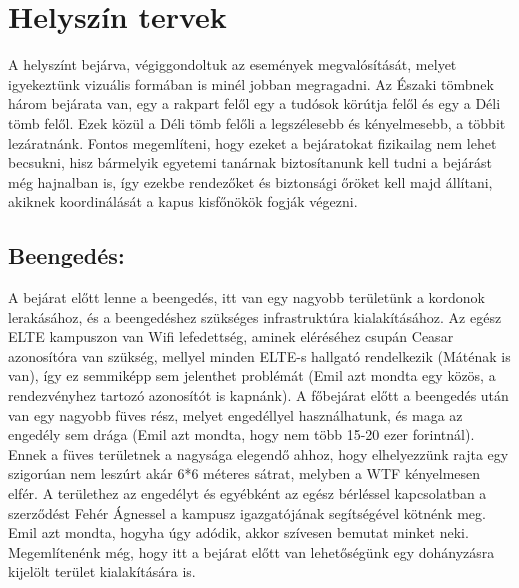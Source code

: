 \section{Helyszín tervek}
\hspace{2mm} A helyszínt bejárva, végiggondoltuk az események megvalósítását, melyet igyekeztünk vizuális formában is minél jobban megragadni. Az Északi tömbnek három bejárata van, egy a rakpart felől egy a tudósok körútja felől és egy a Déli tömb felől. Ezek közül a Déli tömb felőli a legszélesebb és kényelmesebb, a többit lezáratnánk. Fontos megemlíteni, hogy ezeket a bejáratokat fizikailag nem lehet becsukni, hisz bármelyik egyetemi tanárnak biztosítanunk kell tudni a bejárást még hajnalban is, így ezekbe rendezőket és biztonsági őröket kell majd állítani, akiknek koordinálását a kapus kisfőnökök fogják végezni. 

\subsection{Beengedés:}
\hspace{2mm} A bejárat előtt lenne a beengedés, itt van egy nagyobb területünk a kordonok lerakásához, és a beengedéshez szükséges infrastruktúra kialakításához. Az egész ELTE kampuszon van Wifi lefedettség, aminek eléréséhez csupán Ceasar azonosítóra van szükség, mellyel minden ELTE-s hallgató rendelkezik (Máténak is van), így ez semmiképp sem jelenthet problémát (Emil azt mondta egy közös, a rendezvényhez tartozó azonosítót is kapnánk).
\indent A főbejárat előtt a beengedés után van egy nagyobb füves rész, melyet engedéllyel használhatunk, és maga az engedély sem drága (Emil azt mondta, hogy nem több 15-20 ezer forintnál). Ennek a füves területnek a nagysága elegendő ahhoz, hogy elhelyezzünk rajta egy szigorúan nem leszúrt akár 6*6 méteres sátrat, melyben a WTF kényelmesen elfér. A területhez az engedélyt és egyébként az egész bérléssel kapcsolatban a szerződést Fehér Ágnessel a kampusz igazgatójának segítségével kötnénk meg. Emil azt mondta, hogyha úgy adódik, akkor szívesen bemutat minket neki. Megemlítenénk még, hogy itt a bejárat előtt van lehetőségünk egy dohányzásra kijelölt terület kialakítására is.

